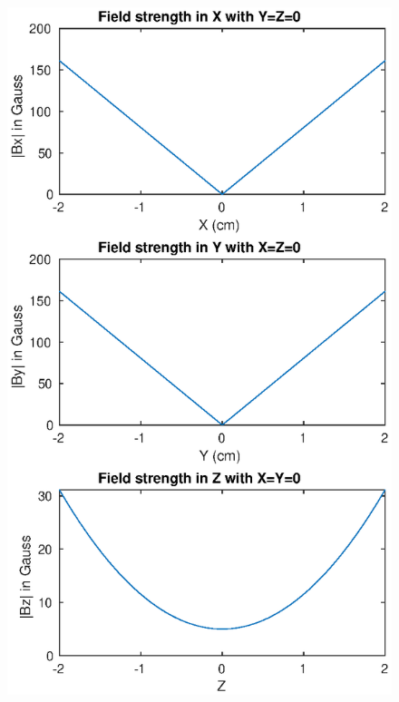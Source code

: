 \documentclass{book}
\theoremstyle{definition}
\begin{document}
\begin{figure}[!htb]
	\centering
	
	\begin{minipage}{.49\textwidth}
		\centering
		\includegraphics[width=\linewidth]{sim-figs/IP-1.eps}
	\end{minipage}%
	\begin{minipage}{.49\textwidth}
		\centering

\end{minipage}
\end{figure}
\end{document}

